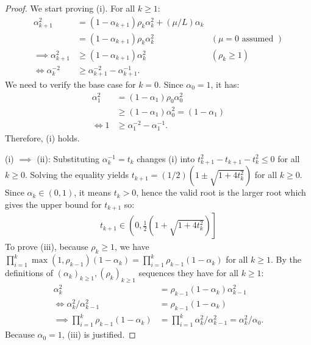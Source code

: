 \documentclass[12pt]{article}
\begin{document}
    \begin{proof}
        We start proving (i).
        For all $k \ge 1$:
        \begin{align*}
            \alpha_{k + 1}^2
            &= (1 - \alpha_{k + 1})\rho_k\alpha_k^2 + (\mu/L) \alpha_k
            \\
            &= (1 - \alpha_{k + 1})\rho_k\alpha_k^2 &
            (\mu = 0 \text{ assumed } )
            \\
            \implies
            \alpha_{k + 1}^2
            & \ge (1 - \alpha_{k + 1})\alpha_k^2
            &  (\rho_k \ge 1)
            \\
            \iff
            \alpha_k^{-2}
            &\ge
            \alpha_{k + 1}^{-2} - \alpha_{k + 1}^{-1}.
        \end{align*}
        We need to verify the base case for $k = 0$.
        Since $\alpha_0 = 1$, it has:
        \begin{align*}
            \alpha_1^2 &= (1 - \alpha_1)\rho_0\alpha_0^2
            \\
            &\ge (1 - \alpha_1)\alpha_0^2
            = (1 - \alpha_1)
            \\
            \iff
            1 &\ge \alpha_1^{-2} - \alpha_1^{-1}.
        \end{align*}
        Therefore, (i) holds.
        \par
        (i) $\implies$ (ii): Substituting $\alpha_k^{-1} = t_k$ changes (i) into $t_{k + 1}^2 - t_{k + 1} - t_{k}^2 \le 0$ for all $k \ge 0$.
        Solving the equality yields $t_{k + 1} = (1/2)\left(1 \pm \sqrt{1 + 4 t_k^2}\right)$ for all $k \ge 0$.
        Since $\alpha_k \in (0, 1)$, it means $t_k > 0$, hence the valid root is the larger root which gives the upper bound for $t_{k + 1}$ so:
        \begin{align*}
            t_{k + 1} \in \left(
                0, \frac{1}{2}\left(1 + \sqrt{1 + 4t_k^2}\right)
            \right]
        \end{align*}
        To prove (iii), because $\rho_k \ge 1$, we have $\prod_{i = 1}^{k} \max(1, \rho_{k - 1})(1 -
        \alpha_k)= \prod_{i = 1}^{k}\rho_{k - 1}(1 - \alpha_k)$ for all $k \ge 1 $.
        By the definitions of $(\alpha_k)_{k \ge 1}, (\rho_k)_{k \ge 1}$ sequences they have for all $k \ge 1$:
        \begin{align*}
            \alpha_k^2 &= \rho_{k - 1}(1 - \alpha_k)\alpha_{k - 1}^2
            \\
            \iff
            \alpha_k^2/\alpha_{k - 1}^2 &= \rho_{k - 1}(1 - \alpha_k)
            \\
            \implies
            \prod_{i = 1}^{k}\rho_{k - 1}(1 - \alpha_k)
            &=
            \prod_{i = 1}^{k}\alpha_k^2 /\alpha_{k - 1}^2= \alpha_k^2/\alpha_0.
        \end{align*}
        Because $\alpha_0 = 1$, (iii) is justified.
    \end{proof}
\end{document}
